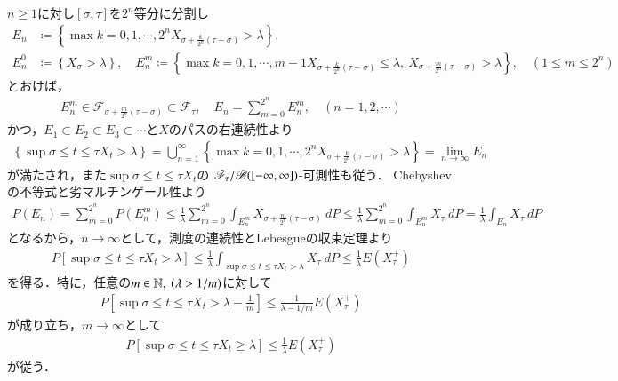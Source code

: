 	\begin{prf}
		$n \geq 1$に対し$[\sigma,\tau]$を$2^n$等分に分割し
		\begin{align}
			E_n &\coloneqq \left\{ \max{k=0,1,\cdots,2^n}{X_{\sigma + \frac{k}{2^n}(\tau - \sigma)} > \lambda} \right\}, \\
			E_n^0 &\coloneqq \left\{ X_\sigma > \lambda \right\}, \quad
			E_n^m \coloneqq \left\{ \max{k=0,1,\cdots,m-1}{X_{\sigma + \frac{k}{2^n}(\tau - \sigma)}} \leq \lambda,\ X_{\sigma + \frac{m}{2^n}(\tau - \sigma)} > \lambda \right\},
			\quad (1 \leq m \leq 2^n)
		\end{align}
		とおけば，
		\begin{align}
			E_n^m \in \mathscr{F}_{\sigma + \frac{m}{2^n}(\tau - \sigma)} \subset \mathscr{F}_\tau,
			\quad E_n = \sum_{m=0}^{2^n} E_n^m,
			\quad (n=1,2,\cdots)	
		\end{align}
		かつ，$E_1 \subset E_2 \subset E_3 \subset \cdots$と$X$のパスの右連続性より
		\begin{align}
			\left\{ \sup{\sigma \leq t \leq \tau}{X_t} > \lambda \right\}
			= \bigcup_{n=1}^\infty \left\{ \max{k=0,1,\cdots,2^n}{X_{\sigma + \frac{k}{2^n}(\tau - \sigma)} > \lambda} \right\}
			= \lim_{n \to \infty} E_n
			\label{eq:chapter_1_Theorem_3_8_2}
		\end{align}
		が満たされ，また$\sup{\sigma \leq t \leq \tau}{X_t}$の
		$\mathscr{F}_\tau/\mathscr{B}([-\infty,\infty])$-可測性も従う．
		Chebyshevの不等式と劣マルチンゲール性より
		\begin{align}
			P(E_n) = \sum_{m=0}^{2^n} P(E_n^m)
			\leq \frac{1}{\lambda} \sum_{m=0}^{2^n} \int_{E_n^m} X_{\sigma + \frac{m}{2^n}(\tau - \sigma)}\ dP
			\leq \frac{1}{\lambda} \sum_{m=0}^{2^n} \int_{E_n^m} X_{\tau}\ dP
			= \frac{1}{\lambda} \int_{E_n} X_\tau\ dP
		\end{align}
		となるから，$n \longrightarrow \infty$として，測度の連続性とLebesgueの収束定理より
		\begin{align}
			P\left[ \sup{\sigma \leq t \leq \tau}{X_t} > \lambda \right]
			\leq \frac{1}{\lambda} \int_{\displaystyle\sup{\sigma \leq t \leq \tau}{X_t} > \lambda} X_\tau\ dP
			\leq \frac{1}{\lambda} E(X^+_\tau)
		\end{align}
		を得る．特に，任意の$m \in \mathbb{N},\ (\lambda > 1/m)$に対して
		\begin{align}
			P\left[ \sup{\sigma \leq t \leq \tau}{X_t} > \lambda - \frac{1}{m} \right]
			\leq \frac{1}{\lambda - 1/m} E(X^+_\tau)
		\end{align}
		が成り立ち，$m \longrightarrow \infty$として
		\begin{align}
			P\left[ \sup{\sigma \leq t \leq \tau}{X_t} \geq \lambda \right]
			\leq \frac{1}{\lambda} E(X^+_\tau)
		\end{align}
		が従う．
		\QED
	\end{prf}
	
